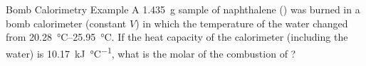 \documentclass[11pt,letterpaper]{article}
\begin{document}
\begin{frame}[t]{Bomb Calorimetry Example}
	A \SI{1.435}{\gram} sample of naphthalene () was burned in a
	bomb calorimeter (constant $V$) in which the temperature of the water
	changed from \SIrange{20.28}{25.95}{\celsius}. If the heat capacity of
	the calorimeter (including the water) is
	\SI{10.17}{\kilo\joule\per\celsius}, what is the molar
	\energy*[superscript=]{} of the
	combustion of ?

\end{frame}

\clearpage
\end{document}
